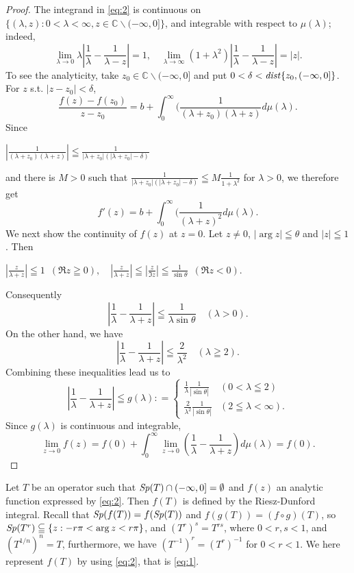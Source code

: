 \documentclass[10pt,a4paper]{amsart}
\begin{document}
\begin{proof} The integrand in \eqref{eq:2} is continuous on  $\{(\lambda , z ): 0<\lambda <\infty, 
z\in \mathbb{C} \smallsetminus (-\infty, 0] \}$, 
 and integrable with respect to $\mu(\lambda)$; indeed, 
$$\lim_{\lambda \to 0} \lambda |\frac{1}{\lambda} - \frac{1}{\lambda -z}| =1, \quad 
\lim_{\lambda \to \infty} ( 1+ \lambda ^2) |\frac{1}{\lambda} 
- \frac{1}{\lambda -z}| =|z|.$$
To see the analyticity, take $z_0 \in \mathbb{C} \smallsetminus (-\infty, 0] $ and put
$0<\delta < {\it dist}\{ z_0, (-\infty, 0]\}$. For $z$ s.t. $|z - z_0|<\delta$, 
$$\frac{f(z) - f(z_0)}{z- z_0} = b + \int_0^{\infty} (\frac{1}{(\lambda + z_0) (\lambda + z)} d\mu(\lambda).$$
Since 
\begin{center} 
$|\frac{1}{(\lambda + z_0) (\lambda + z)}| \leqq \frac{1}{|\lambda + z_0| (|\lambda + z_0| - \delta )} $
\end{center} 
and there is $M>0$ such that 
$\frac{1}{|\lambda + z_0| (|\lambda + z_0| - \delta )} \leqq M \frac{1}{1 + \lambda ^2}$ for $\lambda >0$,
we therefore get 
$$ f'(z)= b + \int_0^{\infty} (\frac{1}{ (\lambda + z)^2} d\mu(\lambda).$$
 We next show the continuity of $f(z)$ at $z=0$.
Let $z\ne 0$, $|\arg z| \leqq \theta$ and $|z|\leqq 1$. Then
\begin{center}
$|\frac{z}{\lambda + z}|\leqq 1\, \,\, (\Re{z} \geqq 0), \quad 
|\frac{z}{\lambda + z}|\leqq |\frac{z}{\Im z}|\leqq \frac{1}{\sin \theta}\,\,
 \, (\Re{z} <0)$.
\end{center}
Consequently  
$$|\frac{1}{\lambda} - \frac{1}{\lambda + z} | \leqq \frac{1}{\lambda \sin \theta} \quad (\lambda > 0).$$
On the other hand, we have
$$|\frac{1}{\lambda} - \frac{1}{\lambda + z} | \leqq \frac{2}{\lambda ^2} \quad 
(\lambda \geqq 2).$$ Combining these inequalities lead us to   
$$|\frac{1}{\lambda} - \frac{1}{\lambda + z} | \leqq g(\lambda)
: =
\begin{cases}
\frac{1}{\lambda} \frac{1}{ |\sin \theta|}  &  (0 <\lambda \leqq 2)\\
\frac{2}{\lambda^2} \frac{1}{ |\sin \theta|}  & ( 2\leqq \lambda <\infty).
\end{cases}
$$
Since $g(\lambda)$ is continuous and integrable,
$$\lim_{z\to 0} f(z) = f(0) + \int_0^{\infty} \lim_{z\to 0} (\frac{1}{\lambda} - 
\frac{1}{\lambda + z})
 d\mu(\lambda) = f(0).$$
\end{proof}

Let $T$ be an operator such that ${\it Sp}(T) \cap (-\infty, 0] = \emptyset$ and 
$f(z)$ an analytic function expressed by \eqref{eq:2}. Then  
$f(T)$ is defined by the Riesz-Dunford integral. 
Recall that ${\it Sp}(f(T)) = f ({\it Sp}(T))$ and $f(g(T))= (f\circ g)(T)$, so 
${\it Sp}(T^{r}) \subseteqq \{z: -r\pi <\arg z <r \pi\} $,  and  $(T^{r})^s = T^{rs}$,    
where $0<r, s <1$, and  
$ (T^{1/n})^n = T$, furthermore, we have $(T^{-1})^r = (T^r)^{-1}$ for $0<r<1$.  
We here represent $f(T)$ by using \eqref{eq:2}, that is \eqref{eq:1}.  
\end{document}
